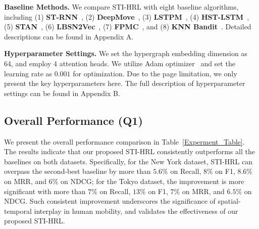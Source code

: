 \documentclass[letterpaper]{article} %
\begin{document}
\noindent \textbf{Baseline Methods.} 
We compare STI-HRL with eight baseline algorithms, including (1) \textbf{ST-RNN}~\cite{liu2016predicting}, (2) \textbf{DeepMove}~\cite{feng2018deepmove}, (3) \textbf{LSTPM}~\cite{sun2020go}, (4) \textbf{HST-LSTM}~\cite{DBLP:conf/ijcai/Kong018}, (5) \textbf{STAN}~\cite{DBLP:conf/www/LuoLL21}, (6) \textbf{LBSN2Vec}~\cite{yang2019revisiting}, (7) \textbf{FPMC}~\cite{rendle2010factorizing}, and (8) \textbf{KNN Bandit}~\cite{sanz2019simple}. 
Detailed descriptions can be found in Appendix A.

\noindent \textbf {Hyperparameter Settings.} 
We set the hypergraph embedding dimension as 64, and employ 4 attention heads. 
We utilize Adam optimizer~\cite{diederik2014adam} and set the learning rate as $0.001$ for optimization. 
Due to the page limitation, we only present the key hyperparameters here. 
The full description of hyperparameter settings can be found in Appendix B. 


\subsection{Overall Performance (Q1)}
We present the overall performance comparison in Table~\ref{Experment_Table}. 
The results indicate that our proposed STI-HRL consistently outperforms all the baselines on both datasets. 
Specifically, for the New York dataset, STI-HRL can overpass the second-best baseline by more than $5.6\%$ on Recall, $8\%$ on F1, $8.6\%$ on MRR, and $6\%$ on NDCG; 
for the Tokyo dataset, the improvement is more significant with more than $7\%$ on Recall, $13\%$ on F1, $7\%$ on MRR, and $6.5\%$ on NDCG.
Such consistent improvement underscores the significance of spatial-temporal interplay in human mobility, and validates the effectiveness of our proposed STI-HRL.
\end{document}
